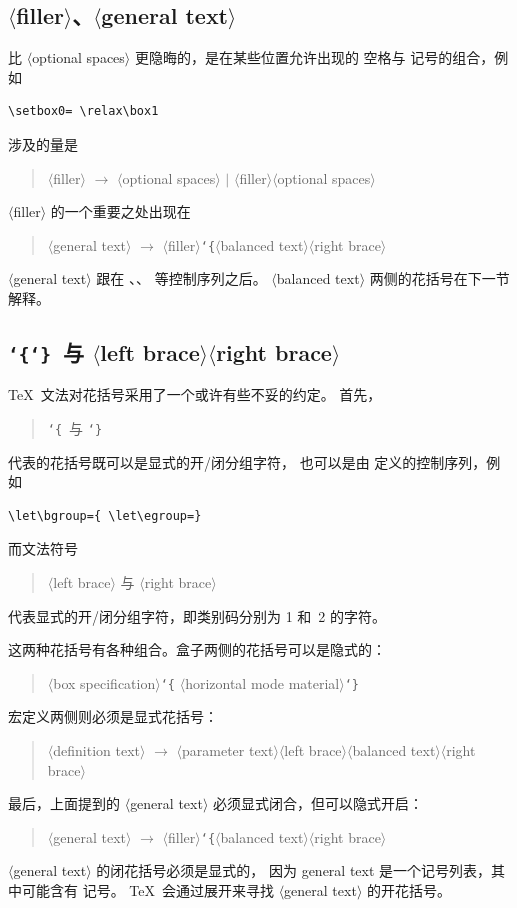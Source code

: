 \documentclass[a4paper]{rapport3}
\def\lb{{\tt\char`\{}}\def\rb{{\tt\char`\}}}
\def\gr#1{$\langle$#1$\rangle$}\def\key#1{{\tt#1}}
\newenvironment{disp}{\begin{quotation}}{\end{quotation}}
\begin{document}
\subsection{\gr{filler}、\gr{general text}}

比 \gr{optional spaces} 更隐晦的，是在某些位置允许出现的
空格与  记号的组合，例如
\begin{verbatim}
\setbox0= \relax\box1
\end{verbatim}
涉及的量是
\begin{disp}\gr{filler} $\longrightarrow$ \gr{optional spaces}
     $|$ \gr{filler}\gr{optional spaces}\end{disp}
\gr{filler} 的一个重要之处出现在
\begin{disp}\gr{general text} $\longrightarrow$
     \gr{filler}\lb\gr{balanced text}\gr{right brace}
     \end{disp}
\gr{general text} 跟在 、、 等控制序列之后。
\gr{balanced text} 两侧的花括号在下一节解释。

\subsection{\lb\rb\ 与 \gr{left brace}\gr{right brace}}

\TeX\ 文法对花括号采用了一个或许有些不妥的约定。
首先，\begin{disp}\lb\ 与 \rb\end{disp}
代表的花括号既可以是显式的开/闭分组字符，
也可以是由  定义的控制序列，例如
\begin{verbatim}
\let\bgroup={ \let\egroup=}
\end{verbatim}
而文法符号 \begin{disp}\gr{left brace} 与 \gr{right brace}
\end{disp}
代表显式的开/闭分组字符，即类别码分别为 1 和~2 的字符。

这两种花括号有各种组合。盒子两侧的花括号可以是隐式的：
\begin{disp}\gr{box specification}\lb
     \gr{horizontal mode material}\rb\end{disp}
宏定义两侧则必须是显式花括号：
\begin{disp}\gr{definition text} $\longrightarrow$
     \gr{parameter text}\gr{left brace}\gr{balanced text}\gr{right brace}
     \end{disp}
最后，上面提到的 \gr{general text} 必须显式闭合，但可以隐式开启：
\begin{disp}\gr{general text} $\longrightarrow$
     \gr{filler}\lb\gr{balanced text}\gr{right brace}
     \end{disp}
\gr{general text} 的闭花括号必须是显式的，
因为 general text 是一个记号列表，其中可能含有  记号。
\TeX\ 会通过展开来寻找 \gr{general text} 的开花括号。
\end{document}
